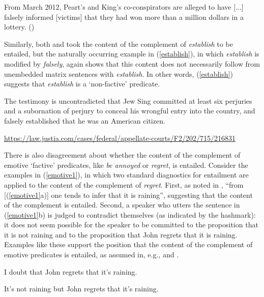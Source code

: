 \documentclass[11pt,fleqn]{article}
\def\infelic{{\leavevmode\llap{\#}}}
\newcommand{\6}{\mbox{$[\hspace*{-.6mm}[$}}
\newcommand{\9}{\mbox{$]\hspace*{-.6mm}]$}}
\begin{document}
\begin{exe}
\ex\label{inform2} From March 2012, Peart's and King's co-conspirators are alleged to have [...] falsely informed [victims] that they had won more than a million dollars in a lottery. \hfill (\citealt[76]{anand-hacquard2014})
\end{exe}
Similarly, both \citet{wyse} and \citet{swanson2012} took the content of the complement of {\em establish} to be entailed, but the naturally occurring example in (\ref{establish}), in which {\em establish} is  modified by {\em falsely}, again shows that this content does not necessarily follow from unembedded matrix sentences with {\em establish}. In other words, (\ref{establish}) suggests that {\em establish} is a `non-factive' predicate.

\begin{exe}
\ex\label{establish} The testimony is uncontradicted that Jew Sing committed at least six perjuries and a subornation of perjury to conceal his wrongful entry into the country, and falsely established that he was an American citizen. \hfill \begin{footnotesize}\url{https://law.justia.com/cases/federal/appellate-courts/F2/202/715/216831}\end{footnotesize}
\end{exe}

There is also disagreement about whether the content of the complement of emotive `factive' predicates, like {\em be annoyed} or {\em regret}, is entailed. Consider the examples in (\ref{emotive1}), in which two standard diagnostics for entailment are applied to the content of the complement of {\em regret}. First, as noted in \citealt[514]{abrusan2011}, ``from [(\ref{emotive1}a)] one tends to infer that it is raining'', suggesting that the content of the complement is entailed. Second, a speaker who utters the sentence in (\ref{emotive1}b) is judged to contradict themselves (as indicated by the hashmark): it does not seem possible for the speaker to be committed to the proposition that it is not raining and to the proposition that John regrets that it is raining. Examples like these support the position that the content of the  complement of emotive predicates is entailed, as assumed in, e.g., \citealt{gazdar79a,abrusan2011} and \citealt{anand-hacquard2014}.

\begin{exe}

\ex\label{emotive1} \citealt[514]{abrusan2011}

\begin{xlist}

\ex I doubt that John regrets that it's raining.

\ex \infelic It's not raining but John regrets that it's raining. 

\end{xlist}

\end{exe}
\end{document}
